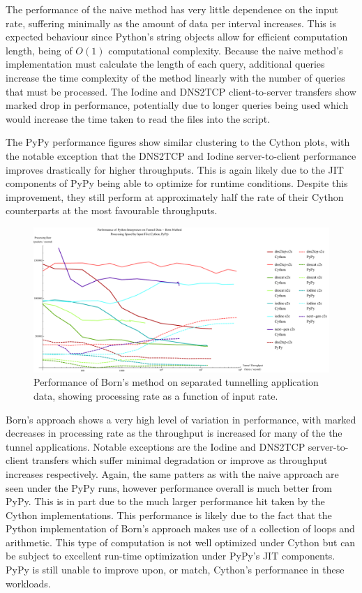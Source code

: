 \documentclass[12pt]{report}
\theoremstyle{remark}
\theoremstyle{definition}
\theoremstyle{definition}
\theoremstyle{definition}
\begin{document}
The performance of the naive method has very little dependence on the input
rate, suffering minimally as the amount of data per interval increases. This is
expected behaviour since Python's string objects allow for efficient computation
length, being of $O(1)$ computational complexity\cite{python-strlencplx}.
Because the naive method's implementation must calculate the length of each
query, additional queries increase the time complexity of the method linearly
with the number of queries that must be processed. The Iodine and DNS2TCP
client-to-server transfers show marked drop in performance, potentially due to
longer queries being used which would increase the time taken to read the files
into the script.

The PyPy performance figures show similar clustering to the Cython plots, with
the notable exception that the DNS2TCP and Iodine server-to-client performance
improves drastically for higher throughputs. This is again likely due to the JIT
components of PyPy being able to optimize for runtime conditions. Despite this
improvement, they still perform at approximately half the rate of their Cython
counterparts at the most favourable throughputs.

\begin{figure}
\centering
\includegraphics[width=\textwidth]{figures/ppia-born.pdf}
\caption[Performance of Born's Method on Tunnel Data by Python
Interpreter]{Performance of Born's method on separated tunnelling application
data, showing processing rate as a function of input rate.}
\label{ppia-born}
\end{figure}

Born's approach shows a very high level of variation in performance, with marked
decreases in processing rate as the throughput is increased for many of the the
tunnel applications. Notable exceptions are the Iodine and DNS2TCP
server-to-client transfers which suffer minimal degradation or improve as
throughput increases respectively. Again, the same patters as with the naive
approach are seen under the PyPy runs, however performance overall is much
better from PyPy. This is in part due to the much larger performance hit taken
by the Cython implementations. This performance is likely due to the fact that
the Python implementation of Born's approach makes use of a collection of loops
and arithmetic. This type of computation is not well optimized under Cython but
can be subject to excellent run-time optimization under PyPy's JIT components.
PyPy is still unable to improve upon, or match, Cython's performance in these
workloads.
\end{document}
